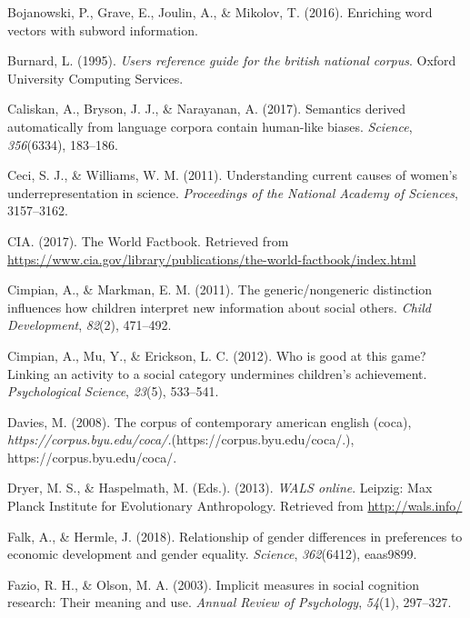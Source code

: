 \documentclass[man,floatsintext]{apa6}
\begin{document}
\leavevmode\hypertarget{ref-bojanowski2016enriching}{}%
Bojanowski, P., Grave, E., Joulin, A., \& Mikolov, T. (2016). Enriching word vectors with subword information.

\leavevmode\hypertarget{ref-burnard1995users}{}%
Burnard, L. (1995). \emph{Users reference guide for the british national corpus}. Oxford University Computing Services.

\leavevmode\hypertarget{ref-caliskan2017semantics}{}%
Caliskan, A., Bryson, J. J., \& Narayanan, A. (2017). Semantics derived automatically from language corpora contain human-like biases. \emph{Science}, \emph{356}(6334), 183--186.

\leavevmode\hypertarget{ref-ceci2011understanding}{}%
Ceci, S. J., \& Williams, W. M. (2011). Understanding current causes of women's underrepresentation in science. \emph{Proceedings of the National Academy of Sciences}, 3157--3162.

\leavevmode\hypertarget{ref-ciafactbook}{}%
CIA. (2017). The World Factbook. Retrieved from \url{https://www.cia.gov/library/publications/the-world-factbook/index.html}

\leavevmode\hypertarget{ref-cimpian2011generic}{}%
Cimpian, A., \& Markman, E. M. (2011). The generic/nongeneric distinction influences how children interpret new information about social others. \emph{Child Development}, \emph{82}(2), 471--492.

\leavevmode\hypertarget{ref-cimpian2012good}{}%
Cimpian, A., Mu, Y., \& Erickson, L. C. (2012). Who is good at this game? Linking an activity to a social category undermines children's achievement. \emph{Psychological Science}, \emph{23}(5), 533--541.

\leavevmode\hypertarget{ref-davies2008corpus}{}%
Davies, M. (2008). The corpus of contemporary american english (coca), \emph{https://corpus.byu.edu/coca/.}(https://corpus.byu.edu/coca/.), https://corpus.byu.edu/coca/.

\leavevmode\hypertarget{ref-wals}{}%
Dryer, M. S., \& Haspelmath, M. (Eds.). (2013). \emph{WALS online}. Leipzig: Max Planck Institute for Evolutionary Anthropology. Retrieved from \url{http://wals.info/}

\leavevmode\hypertarget{ref-falk2018relationship}{}%
Falk, A., \& Hermle, J. (2018). Relationship of gender differences in preferences to economic development and gender equality. \emph{Science}, \emph{362}(6412), eaas9899.

\leavevmode\hypertarget{ref-fazio2003implicit}{}%
Fazio, R. H., \& Olson, M. A. (2003). Implicit measures in social cognition research: Their meaning and use. \emph{Annual Review of Psychology}, \emph{54}(1), 297--327.
\end{document}
